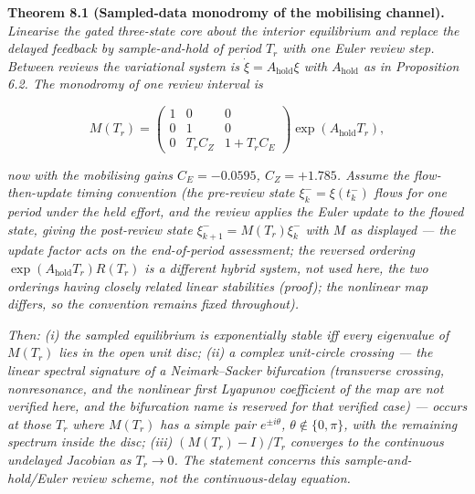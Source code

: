 \documentclass[11pt]{article}
\begin{document}
\textbf{Theorem 8.1 (Sampled-data monodromy of the mobilising channel).}
\emph{Linearise the gated three-state core about the interior
equilibrium and replace the delayed feedback by sample-and-hold of
period \(T_r\) with one Euler review step. Between reviews the
variational system is \(\dot\xi = A_{\mathrm{hold}}\xi\) with
\(A_{\mathrm{hold}}\) as in Proposition 6.2. The monodromy of one review
interval is}

\[M(T_r) = \begin{pmatrix} 1 & 0 & 0 \\ 0 & 1 & 0 \\ 0 & T_r C_Z & 1 + T_r C_E \end{pmatrix} \exp(A_{\mathrm{hold}} T_r), \tag{12}\]

\emph{now with the mobilising gains \(C_E = -0.0595\), \(C_Z = +1.785\).
Assume the flow-then-update timing convention (the pre-review state
\(\xi_k^- = \xi(t_k^-)\) flows for one period under the held effort, and
the review applies the Euler update to the flowed state, giving the
post-review state \(\xi_{k+1}^- = M(T_r)\xi_k^-\) with \(M\) as
displayed --- the update factor acts on the end-of-period assessment;
the reversed ordering \(\exp(A_{\mathrm{hold}}T_r)R(T_r)\) is a
different hybrid system, not used here, the two orderings having closely
related linear stabilities (proof); the nonlinear map differs, so the
convention remains fixed throughout).}

\emph{Then: (i) the sampled equilibrium is exponentially stable iff
every eigenvalue of \(M(T_r)\) lies in the open unit disc; (ii) a
complex unit-circle crossing --- the linear spectral signature of a
Neimark--Sacker bifurcation (transverse crossing, nonresonance, and the
nonlinear first Lyapunov coefficient of the map are not verified here,
and the bifurcation name is reserved for that verified case) --- occurs
at those \(T_r\) where \(M(T_r)\) has a simple pair \(e^{\pm i\theta}\),
\(\theta \notin \{0, \pi\}\), with the remaining spectrum inside the
disc; (iii) \((M(T_r) - I)/T_r\) converges to the continuous undelayed
Jacobian as \(T_r \to 0\). The statement concerns this
sample-and-hold/Euler review scheme, not the continuous-delay equation.}
\end{document}
